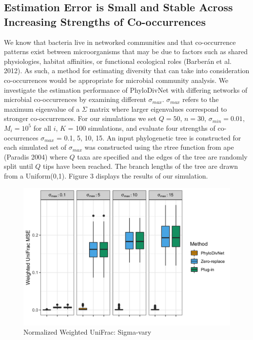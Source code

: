 \documentclass{article}
\newcommand*{\myfont}{\fontfamily{lmtt}\selectfont}
\begin{document}
\subsection{Estimation Error is Small and Stable Across Increasing Strengths of Co-occurrences}
We know that bacteria live in networked communities and that co-occurrence patterns exist between microorganisms that may be due to factors such as shared physiologies, habitat affinities, or functional ecological roles (Barber\'an et al. 2012). As such, a method for estimating diversity that can take into consideration co-occurrences would be appropriate for microbial community analysis. We investigate the estimation performance of {\myfont PhyloDivNet} with differing networks of microbial co-occurrences by examining different $\sigma_{max}$. $\sigma_{max}$ refers to the maximum eigenvalue of a $\Sigma$ matrix where larger eigenvalues correspond to stronger co-occurrences. For our simulations we set $Q = 50$, $n = 30$, $\sigma_{min} = 0.01$, $M_{i} = 10^5$ for all $i$, $K$ = 100 simulations, and evaluate four strengths of co-occurrences $\sigma_{max}$ = 0.1, 5, 10, 15. An input phylogenetic tree is constructed for each simulated set of $\sigma_{max}$ was constructed using the {\myfont rtree} function from {\myfont ape} (Paradis 2004) where $Q$ taxa are specified and the edges of the tree are randomly split until $Q$ tips have been reached. The branch lengths of the tree are drawn from a Uniform(0,1). Figure 3 displays the results of our simulation.
\begin{figure}[!htb]
 \captionsetup{singlelinecheck = false, format= hang, justification = raggedright, font = sf, labelsep = space}
  \caption{Normalized Weighted UniFrac: Sigma-vary}
  \centering
  \includegraphics[width=\textwidth]{s_vary.png}
\end{figure}
\end{document}
